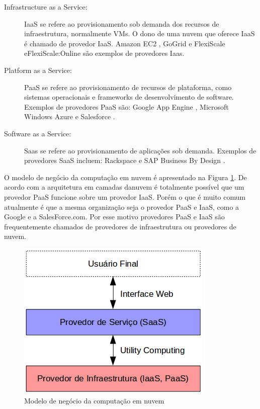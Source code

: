 \begin{description}

\item[Infrastructure as a Service:] IaaS se refere ao provisionamento sob demanda dos recursos de infraestrutura, normalmente VMs. O dono de uma nuvem que oferece IaaS é chamado de provedor IaaS. Amazon EC2 \cite{AmazonEC2:Online}, GoGrid \cite{GoGrid:Online} e FlexiScale \citep{Aguiar:2005}e{FlexiScale:Online} são exemplos de provedores Iaas.

\item [Platform as a Service:] PaaS se refere ao provisionamento de recursos de plataforma, como sistemas operacionais e frameworks de desenvolvimento de software. Exemplos de provedores PaaS são: Google App Engine \cite{GoogleAppEngine:Online}, Microsoft Windows Azure \cite{MicrosoftAzure:Online} e Salesforce \cite{Salesforce:Online}.

\item[Software as a Service:] Saas se refere ao provisionamento de aplicações sob demanda. Exemplos de provedores SaaS incluem: Rackspace \cite{Rackspace:Online} e SAP Business By Design \cite{SAP:Online}.

\end{description}

O modelo de negócio da computação em nuvem é apresentado na Figura \ref{business-model}. De acordo com a arquitetura em camadas danuvem é totalmente possível que um provedor PaaS funcione sobre um provedor IaaS. Porém o que é muito comum atualmente é que a mesma organização seja o provedor PaaS e IaaS, como a Google e a SalesForce.com. Por esse motivo provedores PaaS e IaaS são frequentemente chamados de provedores de infraestrutura ou provedores de nuvem.

\begin{figure}[htbp]
  \centering \includegraphics[scale=.6]{imgs/business-model.png}
\caption{Modelo de negócio da computação em nuvem} 
\label{business-model}
\end{figure}


